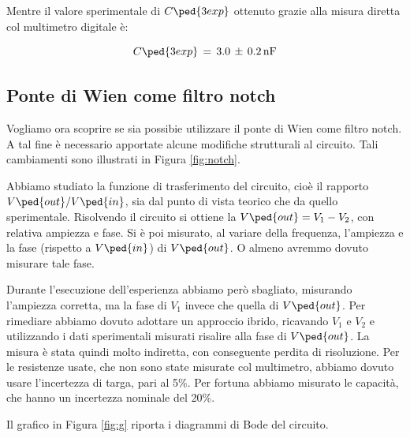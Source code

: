 Mentre il valore sperimentale di $C\ped{3exp}$ ottenuto grazie alla misura diretta col multimetro digitale è:

\begin{equation}
	C\ped{3exp} \,=\, 3.0 \,\pm\, 0.2 \,\si{\nano\farad}
	\label{eq:C_exp} 
\end{equation}

\subsection*{Ponte di Wien come filtro notch}

Vogliamo ora scoprire se sia possibie utilizzare il ponte di Wien come filtro notch. A tal fine è necessario apportate alcune modifiche strutturali al circuito. Tali cambiamenti sono illustrati in Figura \ref{fig:notch}.

Abbiamo studiato la funzione di trasferimento del circuito, cioè il rapporto $V\ped{out}/V\ped{in}$, sia dal punto di vista teorico che da quello sperimentale. Risolvendo il circuito si ottiene la $V\ped{out} = V_1 - V_2$, con relativa ampiezza e fase. Si è poi misurato, al variare della frequenza, l'ampiezza e la fase (rispetto a $V\ped{in}$) di $V\ped{out}$. O almeno avremmo dovuto misurare tale fase.

Durante l'esecuzione dell'esperienza abbiamo però sbagliato, misurando l'ampiezza corretta, ma la fase di $V_1$ invece che quella di $V\ped{out}$. Per rimediare abbiamo dovuto adottare un approccio ibrido, ricavando $V_1$ e $V_2$ e utilizzando i dati sperimentali misurati risalire alla fase di $V\ped{out}$. La misura è stata quindi molto indiretta, con conseguente perdita di risoluzione. Per le resistenze usate, che non sono state misurate col multimetro, abbiamo dovuto usare l'incertezza di targa, pari al 5\%. Per fortuna abbiamo misurato le capacità, che hanno un incertezza nominale del 20\%.

Il grafico in Figura \ref{fig:g} riporta i diagrammi di Bode del circuito.

